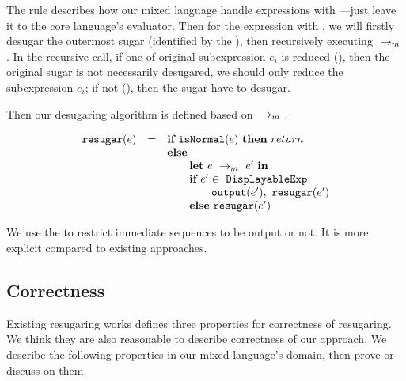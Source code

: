 {}

{
}

The  rule describes how our mixed language handle expressions with ---just leave it to the core language's evaluator. Then for the expression with , we will firstly desugar the outermost sugar (identified by the ), then recursively executing $~\rightarrow_m~$. In the recursive call, if one of original subexpression $e_i$ is reduced (), then the original sugar is not necessarily desugared, we should only reduce the subexpression $e_i$; if not (), then the sugar have to desugar.


Then our desugaring algorithm is defined based on $~\rightarrow_m~$.

\[
\begin{array}{llll}
\mbox{\tt resugar} (e) &=& \mbox{\rm \bf if}~\mbox{\tt isNormal}(e)~\mbox{\rm \bf then}~return\\
              & & \mbox{\rm \bf else}~\\
							& & \qquad \mbox{\rm \bf let}~e ~\rightarrow_m~e'~\mbox{\rm \bf in}\\
							& & \qquad \mbox{\rm \bf if}~e' \in~\mbox{\tt DisplayableExp} \\
							& & \qquad \qquad \mbox{\tt output}(e'),~\mbox{\tt resugar}(e')\\
							& & \qquad \mbox{\rm \bf else}~\mbox{\tt resugar}(e')
\end{array}
\]

We use the  to restrict immediate sequences to be output or not. It is more explicit compared to existing approaches.

\subsection{Correctness}
\label{mark:correct}

Existing resugaring works\cite{resugaring,hygienic} defines three properties for correctness of resugaring. We think they are also reasonable to describe correctness of our approach. We describe the following properties in our mixed language's domain, then prove or discuss on them.

